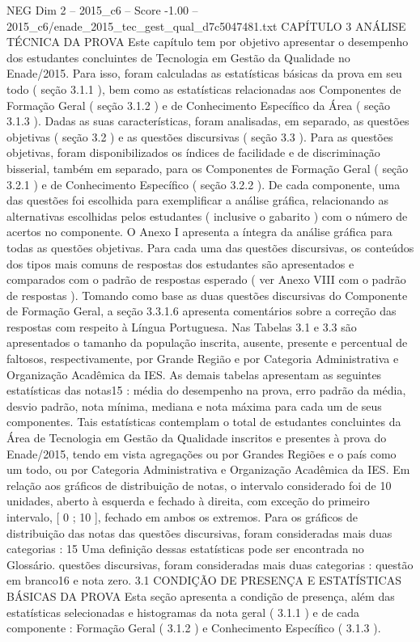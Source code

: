 \begin{textsample}{NEG Dim 2 – 2015\_c6 – Score -1.00 – 2015\_c6/enade\_2015\_tec\_gest\_qual\_d7c5047481.txt}  \label{ex:f2_neg_198}
CAPÍTULO 3 ANÁLISE TÉCNICA DA PROVA Este capítulo tem por objetivo apresentar o desempenho dos estudantes concluintes de Tecnologia em Gestão da Qualidade no Enade/2015.
Para isso, foram calculadas as estatísticas básicas da prova em seu todo ( seção 3.1.1 ), bem como as estatísticas relacionadas aos Componentes de Formação Geral ( seção 3.1.2 ) e de Conhecimento Específico da Área ( seção 3.1.3 ).
Dadas as suas características, foram analisadas, em separado, as questões objetivas ( seção 3.2 ) e as questões discursivas ( seção 3.3 ).
Para as questões objetivas, foram disponibilizados os índices de facilidade e de discriminação bisserial, também em separado, para os Componentes de Formação Geral ( seção 3.2.1 ) e de Conhecimento Específico ( seção 3.2.2 ).
De cada componente, uma das questões foi escolhida para exemplificar a análise gráfica, relacionando as alternativas escolhidas pelos estudantes ( inclusive o gabarito ) com o número de acertos no componente.
O Anexo I apresenta a íntegra da análise gráfica para todas as questões objetivas.
Para cada uma das questões discursivas, os conteúdos dos tipos mais comuns de respostas dos estudantes são apresentados e comparados com o padrão de respostas esperado ( ver Anexo VIII com o padrão de respostas ).
Tomando como base as duas questões discursivas do Componente de Formação Geral, a seção 3.3.1.6 apresenta comentários sobre a correção das respostas com respeito à Língua Portuguesa.
Nas Tabelas 3.1 e 3.3 são apresentados o tamanho da população inscrita, ausente, presente e percentual de faltosos, respectivamente, por Grande Região e por Categoria Administrativa e Organização Acadêmica da IES.
As demais tabelas apresentam as seguintes estatísticas das notas15 : média do desempenho na prova, erro padrão da média, desvio padrão, nota mínima, mediana e nota máxima para cada um de seus componentes.
Tais estatísticas contemplam o total de estudantes concluintes da Área de Tecnologia em Gestão da Qualidade inscritos e presentes à prova do Enade/2015, tendo em vista agregações ou por Grandes Regiões e o país como um todo, ou por Categoria Administrativa e Organização Acadêmica da IES.
Em relação aos gráficos de distribuição de notas, o intervalo considerado foi de 10 unidades, aberto à esquerda e fechado à direita, com exceção do primeiro intervalo, [ 0 ; 10 ], fechado em ambos os extremos.
Para os gráficos de distribuição das notas das questões discursivas, foram consideradas mais duas categorias : 15 Uma definição dessas estatísticas pode ser encontrada no Glossário. questões discursivas, foram consideradas mais duas categorias : questão em branco16 e nota zero. 3.1 CONDIÇÃO DE PRESENÇA E ESTATÍSTICAS BÁSICAS DA PROVA Esta seção apresenta a condição de presença, além das estatísticas selecionadas e histogramas da nota geral ( 3.1.1 ) e de cada componente : Formação Geral ( 3.1.2 ) e Conhecimento Específico ( 3.1.3 ).

\end{textsample}
